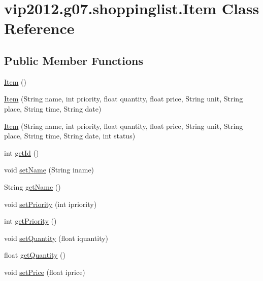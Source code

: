 \hypertarget{classvip2012_1_1g07_1_1shoppinglist_1_1Item}{\section{vip2012.\-g07.\-shoppinglist.\-Item Class Reference}
\label{df/d9c/classvip2012_1_1g07_1_1shoppinglist_1_1Item}
}
\subsection*{Public Member Functions}
\begin{DoxyCompactItemize}
\item 
\hyperlink{classvip2012_1_1g07_1_1shoppinglist_1_1Item_a331ca4db4762134e5c6d542c893ba17b}{Item} ()
\item 
\hyperlink{classvip2012_1_1g07_1_1shoppinglist_1_1Item_a29ab6c8b6d97c0b40e7ec19df1f49bf9}{Item} (String name, int priority, float quantity, float price, String unit, String place, String time, String date)
\item 
\hyperlink{classvip2012_1_1g07_1_1shoppinglist_1_1Item_ad23d924fd73b1f5a34cb1e7f0d1c12b2}{Item} (String name, int priority, float quantity, float price, String unit, String place, String time, String date, int status)
\item 
int \hyperlink{classvip2012_1_1g07_1_1shoppinglist_1_1Item_ad9414ee145d458f315961c1f2e2faf60}{get\-Id} ()
\item 
void \hyperlink{classvip2012_1_1g07_1_1shoppinglist_1_1Item_aa9872e25ee885972342abda59bb3f616}{set\-Name} (String iname)
\item 
String \hyperlink{classvip2012_1_1g07_1_1shoppinglist_1_1Item_a88788d3b8f741aa86f961b71416a55be}{get\-Name} ()
\item 
void \hyperlink{classvip2012_1_1g07_1_1shoppinglist_1_1Item_a447e1639777c78e1a03e3e76553c94d5}{set\-Priority} (int ipriority)
\item 
int \hyperlink{classvip2012_1_1g07_1_1shoppinglist_1_1Item_a5b30fc72fb323a26f8982203546919f0}{get\-Priority} ()
\item 
void \hyperlink{classvip2012_1_1g07_1_1shoppinglist_1_1Item_aa3608aed9d930e5044b9f7cf6ac88830}{set\-Quantity} (float iquantity)
\item 
float \hyperlink{classvip2012_1_1g07_1_1shoppinglist_1_1Item_a18b61c503de2ea99dd5fb92cfcebfa65}{get\-Quantity} ()
\item 
void \hyperlink{classvip2012_1_1g07_1_1shoppinglist_1_1Item_af390549fc22ae4b5921db2b6756a80d6}{set\-Price} (float iprice)

\end{DoxyCompactItemize}
